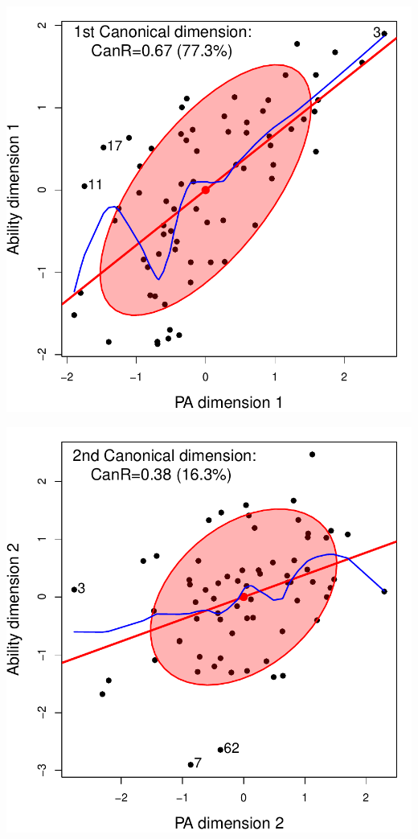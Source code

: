 \begin{frame}[fragile]
  \hfill
  \begin{minipage}[c]{.35\textwidth}
   \includegraphics[width=1\linewidth,clip]{figures/rohwer-cancor}
   \end{minipage}%
  \hfill
  \begin{minipage}[c]{.35\textwidth}
   \includegraphics[width=1\linewidth,clip]{figures/rohwer-cancor2}
  \end{minipage}
  \hfill
\end{frame}
